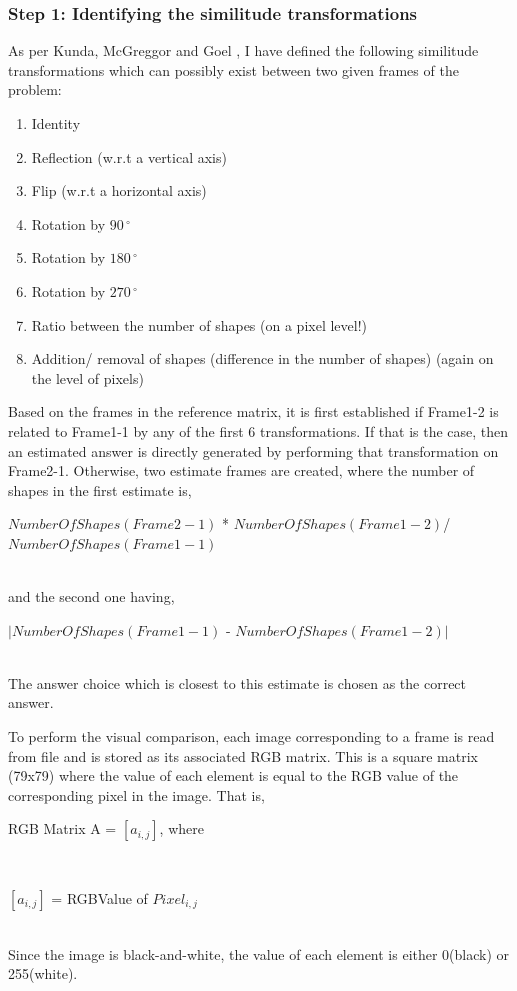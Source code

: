 \documentclass[10pt, letter]{article}
\begin{document}
\subsubsection*{Step 1: Identifying the similitude transformations}
As per Kunda, McGreggor and Goel \cite{paper}, I have defined the following similitude transformations which can possibly exist between two given frames of the problem:
\begin{enumerate}
\item Identity
\item Reflection (w.r.t a vertical axis)
\item Flip (w.r.t a horizontal axis)
\item Rotation by $90\,^{\circ}$
\item Rotation by $180\,^{\circ}$
\item Rotation by $270\,^{\circ}$
\item Ratio between the number of shapes (on a pixel level!)
\item Addition/ removal of shapes (difference in the number of shapes) (again on the level of pixels)
\end{enumerate}

Based on the frames in the reference matrix, it is first established if Frame1-2 is related to Frame1-1 by any of the first 6 transformations. If that is the case, then an estimated answer is directly generated by performing that transformation on Frame2-1. Otherwise, two estimate frames are created, where the number of shapes in the first estimate is, 
\\ \centerline{$NumberOfShapes(Frame2-1)$ * $NumberOfShapes(Frame1-2)$/ $NumberOfShapes(Frame1-1)$}
\\and the second one having, 
\\ \centerline{$|NumberOfShapes(Frame1-1)$ - $NumberOfShapes(Frame1-2)|$}
\\ The answer choice which is closest to this estimate is chosen as the correct answer.


To perform the visual comparison, each image corresponding to a frame is read from file and is stored as its associated RGB matrix. This is a square matrix (79x79) where the value of each element is equal to the RGB value of the corresponding pixel in the image. That is,\\
	\centerline{RGB Matrix A = $[a_{i,j}]$, where}\\
	\centerline{$[a_{i,j}]$ = RGBValue of $Pixel_{i,j}$ }\\
Since the image is black-and-white, the value of each element is either 0(black) or 255(white).
\end{document}
